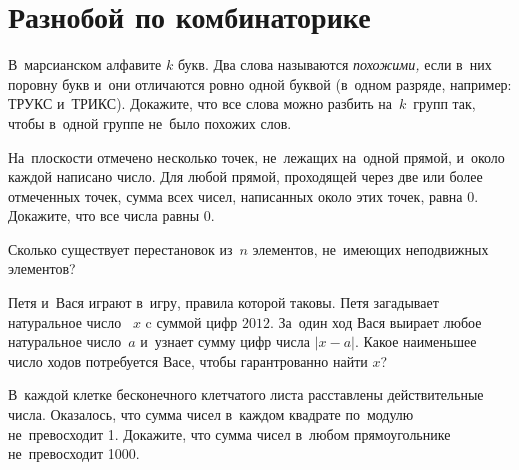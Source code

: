 
\section*{Разнобой по комбинаторике}


\begingroup
    \def\abs#1{\lvert #1 \rvert}%

\begin{problems}

\item
В~марсианском алфавите $k$ букв.
Два слова называются \emph{похожими,} если в~них поровну букв и~они отличаются
ровно одной буквой (в~одном разряде, например: ТРУКС и~ТРИКС).
Докажите, что все слова можно разбить на~$k$~групп так, чтобы в~одной группе
не~было похожих слов.

\item
На~плоскости отмечено несколько точек, не~лежащих на~одной прямой, и~около
каждой написано число.
Для любой прямой, проходящей через две или более отмеченных точек, сумма всех
чисел, написанных около этих точек, равна 0.
Докажите, что все числа равны 0.

\item
Сколько существует перестановок из~$n$ элементов, не~имеющих неподвижных
элементов?

\item
Петя и~Вася играют в~игру, правила которой таковы.
Петя загадывает натуральное число ~$x$ c суммой цифр $2012$.
За~один ход Вася выирает любое натуральное число~$a$ и~узнает сумму цифр
числа $\abs{x - a}$.
Какое наименьшее число ходов потребуется Васе, чтобы гарантрованно найти $x$?

\item
В~каждой клетке бесконечного клетчатого листа расставлены действительные числа.
Оказалось, что сумма чисел в~каждом квадрате по~модулю не~превосходит 1.
Докажите, что сумма чисел в~любом прямоугольнике не~превосходит 1000.

\end{problems}

\endgroup %

